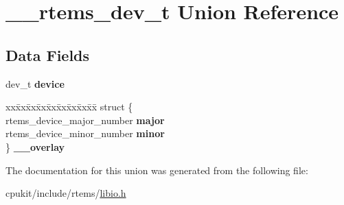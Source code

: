 \hypertarget{union____rtems__dev__t}{}\section{\+\_\+\+\_\+rtems\+\_\+dev\+\_\+t Union Reference}
\label{union____rtems__dev__t}
\subsection*{Data Fields}
\begin{DoxyCompactItemize}
\item 
\mbox{\label{union____rtems__dev__t_afd542ced959cff3e0d4dddb09217c97e}} 
dev\+\_\+t {\bfseries device}
\item 
\mbox{\label{union____rtems__dev__t_a15d40332ea311a156d1e10e179bfcd82}} 
\begin{tabbing}
xx\=xx\=xx\=xx\=xx\=xx\=xx\=xx\=xx\=\kill
struct \{\\
\>rtems\_device\_major\_number {\bfseries major}\\
\>rtems\_device\_minor\_number {\bfseries minor}\\
\} {\bfseries \_\_overlay}\\

\end{tabbing}\end{DoxyCompactItemize}


The documentation for this union was generated from the following file\+:\begin{DoxyCompactItemize}
\item 
cpukit/include/rtems/\mbox{\hyperlink{libio_8h}{libio.\+h}}\end{DoxyCompactItemize}
